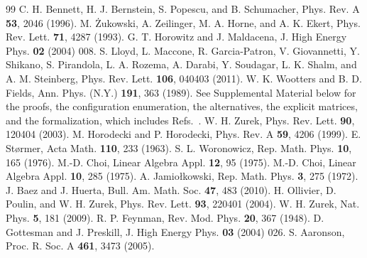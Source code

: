 \documentclass[aps,prl,reprint,superscriptaddress,longbibliography,nofootinbib,floatfix]{revtex4-2}
\theoremstyle{definition}
\begin{document}
\begin{thebibliography}{99}
 C. H. Bennett, H. J. Bernstein, S. Popescu, and B. Schumacher, Phys. Rev. A \textbf{53}, 2046 (1996).
 M. \.{Z}ukowski, A. Zeilinger, M. A. Horne, and A. K. Ekert, Phys. Rev. Lett. \textbf{71}, 4287 (1993).
 G. T. Horowitz and J. Maldacena, J. High Energy Phys. \textbf{02} (2004) 008.
 S. Lloyd, L. Maccone, R. Garcia-Patron, V. Giovannetti, Y. Shikano, S. Pirandola, L. A. Rozema, A. Darabi, Y. Soudagar, L. K. Shalm, and A. M. Steinberg, Phys. Rev. Lett. \textbf{106}, 040403 (2011).
 W. K. Wootters and B. D. Fields, Ann. Phys. (N.Y.) \textbf{191}, 363 (1989).
 See Supplemental Material below for the proofs, the configuration enumeration, the alternatives, the explicit matrices, and the formalization, which includes Refs.~\cite{gottesman2004,aaronson2005}.
 W. H. Zurek, Phys. Rev. Lett. \textbf{90}, 120404 (2003).
 M. Horodecki and P. Horodecki, Phys. Rev. A \textbf{59}, 4206 (1999).
 E. St{\o}rmer, Acta Math. \textbf{110}, 233 (1963).
 S. L. Woronowicz, Rep. Math. Phys. \textbf{10}, 165 (1976).
 M.-D. Choi, Linear Algebra Appl. \textbf{12}, 95 (1975).
 M.-D. Choi, Linear Algebra Appl. \textbf{10}, 285 (1975).
 A. Jamio{\l}kowski, Rep. Math. Phys. \textbf{3}, 275 (1972).
 J. Baez and J. Huerta, Bull. Am. Math. Soc. \textbf{47}, 483 (2010).
 H. Ollivier, D. Poulin, and W. H. Zurek, Phys. Rev. Lett. \textbf{93}, 220401 (2004).
 W. H. Zurek, Nat. Phys. \textbf{5}, 181 (2009).
 R. P. Feynman, Rev. Mod. Phys. \textbf{20}, 367 (1948).
 D. Gottesman and J. Preskill, J. High Energy Phys. \textbf{03} (2004) 026.
 S. Aaronson, Proc. R. Soc. A \textbf{461}, 3473 (2005).
\end{thebibliography}


\end{document}
